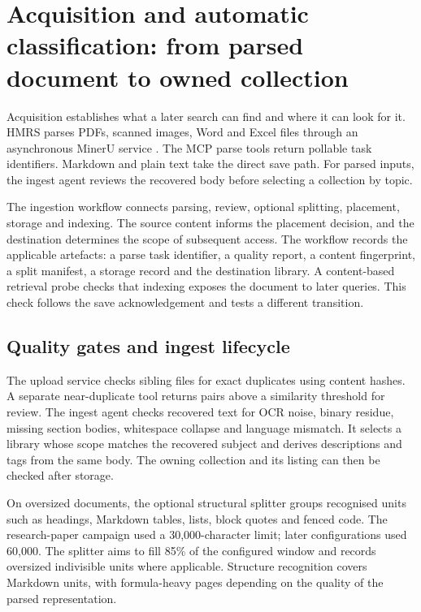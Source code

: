 \section{Acquisition and automatic classification: from parsed document to
owned collection}
\label{sec:acquisition}

Acquisition establishes what a later search can find and where it can
look for it. HMRS parses PDFs, scanned images, Word and Excel files through
an asynchronous MinerU service \citep{mineru}. The MCP parse tools return
pollable task identifiers. Markdown and plain text take the direct save
path. For parsed inputs, the ingest agent reviews the recovered body before
selecting a collection by topic.

The ingestion workflow connects parsing, review, optional splitting,
placement, storage and indexing. The source content informs the placement
decision, and the destination determines the scope of subsequent access.
The workflow records the applicable artefacts: a parse task identifier,
a quality report, a content fingerprint, a split manifest, a storage
record and the destination library. A content-based retrieval probe checks
that indexing exposes the document to later queries. This check follows the
save acknowledgement and tests a different transition.

\subsection{Quality gates and ingest lifecycle}

The upload service checks sibling files for exact duplicates using content
hashes. A separate near-duplicate tool returns pairs above a similarity
threshold for review. The ingest agent checks recovered text for OCR noise,
binary residue, missing section bodies, whitespace collapse and language
mismatch. It selects a library whose scope matches the recovered subject and
derives descriptions and tags from the same body. The owning collection and
its listing can then be checked after storage.

On oversized documents, the optional structural splitter groups recognised
units such as headings, Markdown tables, lists, block quotes and fenced code.
The research-paper campaign used a 30,000-character limit; later configurations used
60,000. The splitter aims to fill 85\% of the configured window and records
oversized indivisible units where applicable. Structure recognition covers
Markdown units, with formula-heavy pages depending on the quality of the
parsed representation.

